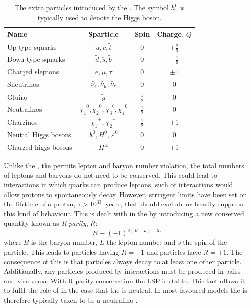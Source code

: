 \begin{table}
\begin{tabular}{|l|c|c|c|}
Name & Sparticle & Spin & Charge, $Q$ \\
\hline
Up-type squarks & $\tilde{u},\tilde{c},\tilde{t}$ & 0 & $+\frac{2}{3}$ \\
Down-type squarks & $\tilde{d},\tilde{s},\tilde{b}$ & 0 & $-\frac{1}{3}$ \\
Charged sleptons & $\tilde{e},\tilde{\mu},\tilde{\tau}$ & 0 & $\pm1$ \\
Sneutrinos & $\tilde{\nu_{e}},\tilde{\nu_{\mu}},\tilde{\nu_{\tau}}$ & 0 & 0 \\
\hline
Gluino & $\tilde{g}$ & $\frac{1}{2}$ & 0 \\
Neutralinos &
$\tilde{\chi_{1}}^0,\tilde{\chi_{2}}^0,\tilde{\chi_{3}}^0,\tilde{\chi_{4}}^0$
& $\frac{1}{2}$ & 0  \\
Charginos & $\tilde{\chi_{1}}^{\pm},\tilde{\chi_{2}}^{\pm}$ &
$\frac{1}{2}$ & $\pm1$ \\
\hline
Neutral Higgs bosons & $h^0,H^0,A^0$ & 0 & 0 \\
Charged higgs bosons & $H^{\pm}$ & 0 & $\pm1$ \\
\end{tabular}
\caption{The extra particles introduced by the \MSSM. The symbol $h^0$
is typically used to denote the \SM Higgs boson.
\cite{Martin:1997ns}}
\label{tab:susy}
\end{table}

Unlike the \SM, the \MSSM permits lepton and baryon number violation,
the total numbers of leptons and baryons do not need to be conserved.
This could lead to interactions in which quarks can produce leptons,
such of interactions would allow protons to spontaneously decay.
However, stringent limits have been set on the lifetime of a proton,
$\tau>10^{33}$~years, that should exclude or heavily suppress this
kind of behaviour. This is dealt with in the \MSSM by introducing a
new conserved quantity known as \emph{R-parity}, $R$:
\begin{equation}
R\equiv (-1)^{3(B-L)+2s}
\end{equation}
where $B$ is the baryon number, $L$ the lepton number and $s$ the spin
of the particle. This leads to \SUSY particles having $R=-1$ and \SM
particles have $R=+1$. The consequence of this is that \SUSY particles
always decay to at least one other \SUSY particle. Additionally, any
\SUSY particles produced by \SM interactions must be produced in
pairs and vice versa. With R-parity conservation the \acf{LSP} is
stable. This fact allows it to fulfil the role of \DM in the case that
the \LSP is neutral. In most favoured \SUSY models the \LSP is
therefore typically taken to be a neutralino \cite{Farrar:1978xj}.

